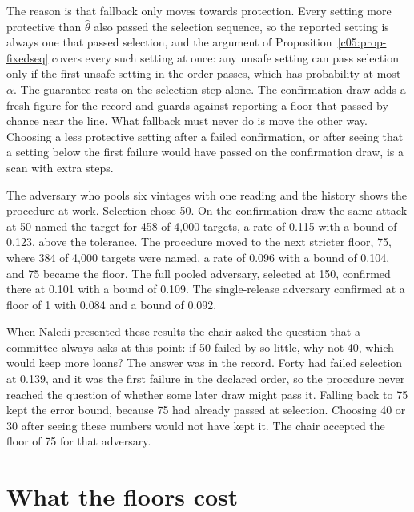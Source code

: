 The reason is that fallback only moves towards protection. Every setting more protective
than $\hat\theta$ also passed the selection sequence, so the reported setting is always
one that passed selection, and the argument of Proposition~\ref{c05:prop-fixedseq} covers
every such setting at once: any unsafe setting can pass selection only if the first unsafe
setting in the order passes, which has probability at most $\alpha$. The guarantee rests
on the selection step alone. The confirmation draw adds a fresh figure for the record and
guards against reporting a floor that passed by chance near the line. What fallback must
never do is move the other way. Choosing a less protective setting after a failed
confirmation, or after seeing that a setting below the first failure would have passed on
the confirmation draw, is a scan with extra steps.

\begin{example}\label{c05:ex-confirm}
The adversary who pools six vintages with one reading and the history shows the procedure
at work. Selection chose 50. On the confirmation draw the same attack at 50 named the
target for 458 of 4,000 targets, a rate of 0.115 with a bound of 0.123, above the
tolerance. The procedure moved to the next stricter floor, 75, where 384 of 4,000 targets
were named, a rate of 0.096 with a bound of 0.104, and 75 became the floor.
The full pooled adversary, selected at 150, confirmed there at 0.101 with a bound of
0.109.
The single-release adversary confirmed at a floor of 1 with 0.084 and a bound of 0.092.
\end{example}


When Naledi presented these results the chair asked the question that a committee always
asks at this point: if 50 failed by so little, why not 40, which would keep more loans?
The answer was in the record. Forty had failed selection at 0.139, and it was the first
failure in the declared order, so the procedure never reached the question of whether
some later draw might pass it. Falling back to 75 kept the error bound, because 75 had
already passed at selection. Choosing 40 or 30 after seeing these numbers would not have
kept it. The chair accepted the floor of 75 for that adversary.

\section{What the floors cost}

